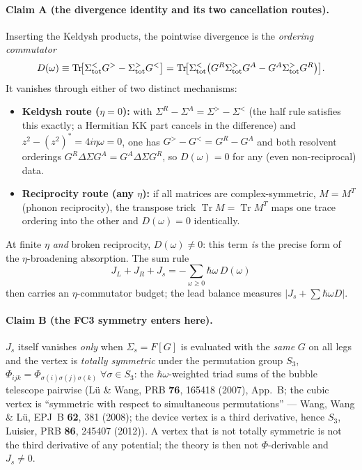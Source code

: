 \documentclass[11pt]{article}
\newcommand{\Tr}{\operatorname{Tr}}
\begin{document}
\paragraph{Claim A (the divergence identity and its two cancellation routes).}
Inserting the Keldysh products, the pointwise divergence is the
\emph{ordering commutator}
\begin{equation}
  D(\omega)\equiv\Tr\!\bigl[\Sigma^<_{\rm tot}G^>-\Sigma^>_{\rm tot}G^<\bigr]
  = \Tr\!\bigl[\Sigma^<_{\rm tot}\bigl(G^R\Sigma^>_{\rm tot}G^A
  - G^A\Sigma^>_{\rm tot}G^R\bigr)\bigr].
  \label{eq:pointwise}
\end{equation}
It vanishes through either of two distinct mechanisms:
\begin{itemize}
\item \textbf{Keldysh route ($\eta=0$):} with
$\Sigma^R-\Sigma^A=\Sigma^>-\Sigma^<$ (the half rule satisfies this
exactly; a Hermitian KK part cancels in the difference) and
$z^2-(z^2)^*=4i\eta\omega=0$, one has $G^>-G^<=G^R-G^A$ and both
resolvent orderings $G^R\Delta\Sigma G^A=G^A\Delta\Sigma G^R$, so
$D(\omega)=0$ for any (even non-reciprocal) data.
\item \textbf{Reciprocity route (any $\eta$):} if all matrices are
complex-symmetric, $M=M^T$ (phonon reciprocity), the transpose trick
$\Tr M=\Tr M^T$ maps one trace ordering into the other and
$D(\omega)=0$ identically.
\end{itemize}
At finite $\eta$ \emph{and} broken reciprocity, $D(\omega)\neq0$:
this term \emph{is} the precise form of the $\eta$-broadening
absorption. The sum rule
\begin{equation}
  J_L+J_R+J_s=-\sum_{\omega\ge0}\hbar\omega\,D(\omega)
  \label{eq:sumrule}
\end{equation}
then carries an $\eta$-commutator budget; the lead balance measures
$|J_s + \sum\hbar\omega D|$.

\paragraph{Claim B (the FC3 symmetry enters here).}
$J_s$ itself vanishes \emph{only} when $\Sigma_s=F[G]$ is evaluated with the
\emph{same} $G$ on all legs and the vertex is \emph{totally symmetric}
under the permutation group $S_3$,
$\Phi_{ijk}=\Phi_{\sigma(i)\sigma(j)\sigma(k)}\;\forall\sigma\in S_3$:
the $\hbar\omega$-weighted triad sums of the bubble telescope pairwise
(L\"u \& Wang, PRB \textbf{76}, 165418 (2007), App.~B; the cubic vertex is
``symmetric with respect to simultaneous permutations'' --- Wang, Wang \&
L\"u, EPJ~B \textbf{62}, 381 (2008); the device vertex is a third
derivative, hence $S_3$, Luisier, PRB \textbf{86}, 245407 (2012)).
A vertex that is not totally symmetric is not the third derivative of any
potential; the theory is then not $\Phi$-derivable and $J_s\neq 0$.
\end{document}
